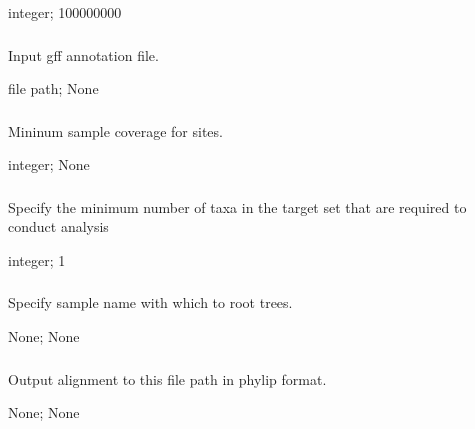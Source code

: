 \documentclass[letterpaper,11pt,english]{sphinxmanual}
\begin{document}
 integer;  100000000


\subsubsection{}
\label{\detokenize{prog_desc:id111}}
 Input gff annotation file.

 file path;  None


\subsubsection{}
\label{\detokenize{prog_desc:id112}}
 Mininum sample coverage for sites.

 integer;  None


\subsubsection{}
\label{\detokenize{prog_desc:num-target-species-targetspec}}
 Specify the minimum number of taxa in the target set that are required to conduct analysis

 integer;  1


\subsubsection{}
\label{\detokenize{prog_desc:outgroup}}
 Specify sample name with which to root trees.

 None;  None


\subsubsection{}
\label{\detokenize{prog_desc:output-align-outputalign}}
 Output alignment to this file path in phylip format.

 None;  None
\end{document}
